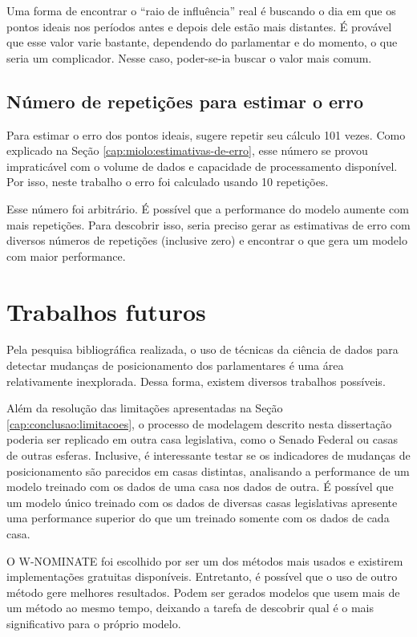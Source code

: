 \documentclass[a4paper,titlepage]{ppgi}\usepackage[]{graphicx}\usepackage[]{color}
\begin{document}
Uma forma de encontrar o ``raio de influência'' real é buscando o dia em que os
pontos ideais nos períodos antes e depois dele estão mais distantes. É provável
que esse valor varie bastante, dependendo do parlamentar e do momento, o que
seria um complicador. Nesse caso, poder-se-ia buscar o valor mais comum.

\subsection{Número de repetições para estimar o erro}

Para estimar o erro dos pontos ideais,  sugere repetir
seu cálculo 101 vezes. Como explicado na Seção
\ref{cap:miolo:estimativas-de-erro}, esse número se provou impraticável com o
volume de dados e capacidade de processamento disponível. Por isso, neste
trabalho o erro foi calculado usando 10 repetições.

Esse número foi arbitrário. É possível que a performance do modelo aumente com
mais repetições. Para descobrir isso, seria preciso gerar as estimativas de
erro com diversos números de repetições (inclusive zero) e encontrar o que gera
um modelo com maior performance.

\section{Trabalhos futuros}

Pela pesquisa bibliográfica realizada, o uso de técnicas da ciência de dados
para detectar mudanças de posicionamento dos parlamentares é uma área
relativamente inexplorada. Dessa forma, existem diversos trabalhos possíveis.

Além da resolução das limitações apresentadas na Seção
\ref{cap:conclusao:limitacoes}, o processo de modelagem descrito nesta
dissertação poderia ser replicado em outra casa legislativa, como o Senado
Federal ou casas de outras esferas. Inclusive, é interessante testar se os
indicadores de mudanças de posicionamento são parecidos em casas distintas,
analisando a performance de um modelo treinado com os dados de uma casa nos
dados de outra. É possível que um modelo único treinado com os dados de
diversas casas legislativas apresente uma performance superior do que
um treinado somente com os dados de cada casa.

O W-NOMINATE foi escolhido por ser um dos métodos mais usados e existirem
implementações gratuitas disponíveis. Entretanto, é possível que o uso de outro
método gere melhores resultados. Podem ser gerados modelos que usem mais de um
método ao mesmo tempo, deixando a tarefa de descobrir qual é o mais
significativo para o próprio modelo.
\end{document}
